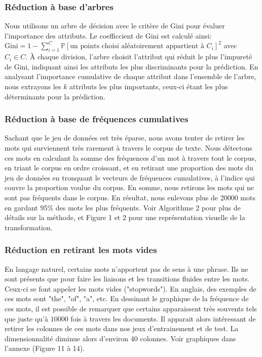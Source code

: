 \documentclass{article}
\begin{document}
\subsubsection{Réduction à base d'arbres}
Nous utilisons un arbre de décision avec le critère de Gini pour évaluer l'importance des attributs. Le coefficcient de Gini est calculé ainsi: $\text{Gini} = 1 - \sum_{i=1}^{C} \mathbb{P}[\text{un points choisi aléatoirement appartient à $C_i$}]^2$ avec $C_i \in C$. À chaque division, l’arbre choisit l’attribut qui réduit le plus l'impureté de Gini, indiquant ainsi les attributs les plus discriminants pour la prédiction. En analysant l'importance cumulative de chaque attribut dans l'ensemble de l'arbre, nous extrayons les $k$ attributs les plus importants, ceux-ci étant les plus déterminants pour la prédiction.
\subsubsection{Réduction à base de fréquences cumulatives}
Sachant que le jeu de données est très éparse,  nous avons tenter de retirer les mots qui surviennent très rarement à travers le corpus de texte. Nous détectons ces mots en calculant la somme des fréquences d'un mot à travers tout le corpus, en triant le corpus en ordre croissant, et en retirant une proportion des mots du jeu de données en tronquant le vecteurs de fréquences cumulatives, à l'indice qui couvre la proportion voulue du corpus. En somme, nous retirons les mots qui ne sont pas fréquents dans le corpus. En résultat, nous enlevons plus de 20000 mots en gardant 95\% des mots les plus fréquents. Voir Algorithme 2 pour plus de détails sur la méthode, et Figure 1 et 2 pour une représentation visuelle de la transformation. 
\subsubsection{Réduction en retirant les mots vides}
En langage naturel, certains mots n'apportent pas de sens à une phrase. Ils ne sont présents que pour faire les liaisons et les transitions fluides entre les mots. Ceux-ci se font appeler les mots vides ("stopwords"). En anglais, des exemples de ces mots sont "the", "of", "a", etc. En dessinant le graphique de la fréquence de ces mots, il est possible de remarquer que certains apparaissent très souvents tels que juste qu'à $10 000$ fois à travers les documents. Il apparait alors intéressant de retirer les colonnes de ces mots dans nos jeux d'entrainement et de test. La dimensionnalité diminue alors d'environ 40 colonnes. Voir graphiques dans l'annexe (Figure 11 à 14).
\end{document}
